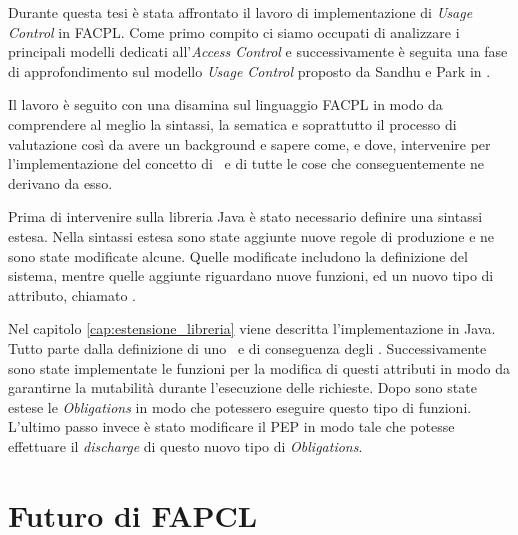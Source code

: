 Durante questa tesi è stata affrontato il lavoro di implementazione di \textit{Usage Control} in FACPL.
Come primo compito ci siamo occupati di analizzare i principali modelli dedicati all'\textit{Access Control} e successivamente è seguita una fase di approfondimento sul modello \textit{Usage Control} proposto da Sandhu e Park in \cite{SurveyUsageControl}. \\ \par
Il lavoro è seguito con una disamina sul linguaggio FACPL in modo da comprendere al meglio la sintassi, la sematica e soprattutto il processo di valutazione così da avere un background e sapere come, e dove, intervenire per l'implementazione del concetto di \status \ e di tutte le cose che conseguentemente ne derivano da esso.\\ \par
Prima di intervenire sulla libreria Java è stato necessario definire una sintassi estesa. Nella sintassi estesa sono state aggiunte nuove regole di produzione e ne sono state modificate alcune. Quelle modificate includono la definizione del sistema, mentre quelle aggiunte riguardano nuove funzioni, ed un nuovo tipo di attributo, chiamato \statusattribute.\\ \par
Nel capitolo \ref{cap:estensione_libreria} viene descritta l'implementazione in Java. Tutto parte dalla definizione di uno \status \ e di conseguenza degli \statusattribute. Successivamente sono state implementate le funzioni per la modifica di questi attributi in modo da garantirne la mutabilità durante l'esecuzione delle richieste. Dopo sono state estese le \textit{Obligations} in modo che potessero eseguire questo tipo di funzioni. L'ultimo passo invece è stato modificare il PEP in modo tale che potesse effettuare il \textit{discharge} di questo nuovo tipo di \textit{Obligations}.
\section{Futuro di FAPCL}
\label{sec:futuro}